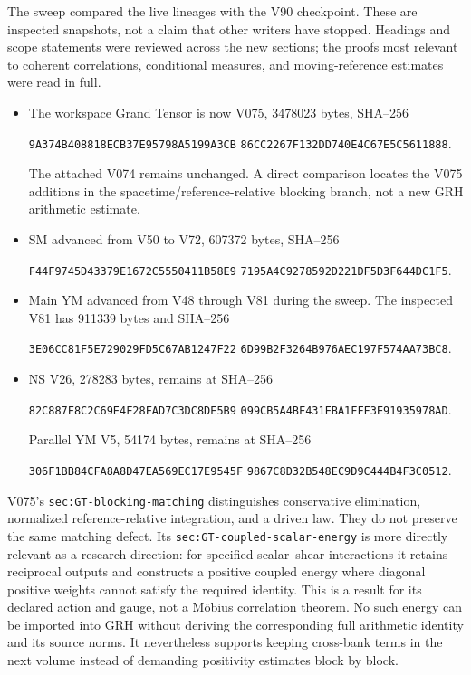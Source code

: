 \documentclass[11pt]{article}
\theoremstyle{definition}
\theoremstyle{remark}
\begin{document}
The sweep compared the live lineages with the V90 checkpoint.  These
are inspected snapshots, not a claim that other writers have stopped.
Headings and scope statements were reviewed across the new sections;
the proofs most relevant to coherent correlations, conditional measures,
and moving-reference estimates were read in full.
\begin{itemize}
\item The workspace Grand Tensor is now V075, 3478023 bytes, SHA--256
\begin{center}
\texttt{9A374B408818ECB37E95798A5199A3CB}\allowbreak
\texttt{86CC2267F132DD740E4C67E5C5611888}.
\end{center}
The attached V074 remains unchanged.  A direct comparison locates
the V075 additions in the spacetime/reference-relative blocking branch,
not a new GRH arithmetic estimate.
\item SM advanced from V50 to V72, 607372 bytes, SHA--256
\begin{center}
\texttt{F44F9745D43379E1672C5550411B58E9}\allowbreak
\texttt{7195A4C9278592D221DF5D3F644DC1F5}.
\end{center}
\item Main YM advanced from V48 through V81 during the sweep.
The inspected V81 has 911339 bytes and SHA--256
\begin{center}
\texttt{3E06CC81F5E729029FD5C67AB1247F22}\allowbreak
\texttt{6D99B2F3264B976AEC197F574AA73BC8}.
\end{center}
\item NS V26, 278283 bytes, remains at SHA--256
\begin{center}
\texttt{82C887F8C2C69E4F28FAD7C3DC8DE5B9}\allowbreak
\texttt{099CB5A4BF431EBA1FFF3E91935978AD}.
\end{center}
Parallel YM V5, 54174 bytes, remains at SHA--256
\begin{center}
\texttt{306F1BB84CFA8A8D47EA569EC17E9545F}\allowbreak
\texttt{9867C8D32B548EC9D9C444B4F3C0512}.
\end{center}
\end{itemize}

V075's \texttt{sec:GT-blocking-matching} distinguishes conservative
elimination, normalized reference-relative integration, and a driven
law.  They do not preserve the same matching defect.  Its
\texttt{sec:GT-coupled-scalar-energy} is more directly relevant as
a research direction: for specified scalar--shear interactions it
retains reciprocal outputs and constructs a positive coupled energy
where diagonal positive weights cannot satisfy the required identity.
This is a result for its declared action and gauge, not a M\"obius
correlation theorem.  No such energy can be imported into GRH without
deriving the corresponding full arithmetic identity and its source
norms.  It nevertheless supports keeping cross-bank terms in the
next volume instead of demanding positivity estimates block by block.
\end{document}
